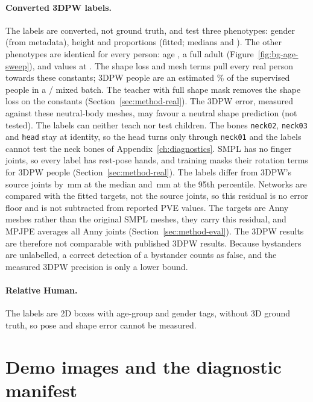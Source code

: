 \paragraph{Converted 3DPW labels.} The labels are converted, not ground truth, and test three phenotypes:
gender (from metadata), height and proportions (fitted; medians \DataLabelMedianHeight{} and
\DataLabelMedianProportions). The other \DataConstantCount{} phenotypes are identical for every person: age \DataFixedAge{}, a
full adult (Figure~\ref{fig:bg-age-sweep}), and \DataNeutralCount{} values at \DataFixedNeutral. The shape loss and
mesh terms pull every real person towards these constants; 3DPW people are an estimated
\DataSupervisedShareThreeDPW\% of the supervised people in a \DataMixAnnyOne/\DataMixThreeDPW{} mixed batch. The teacher
with full shape mask removes the shape loss on the constants (Section~\ref{sec:method-real}). The 3DPW error, measured
against these neutral-body meshes, may favour a neutral shape prediction (not tested). The labels can neither
teach nor test children. The bones \texttt{neck02}, \texttt{neck03} and
\texttt{head} stay at identity, so the head turns only through \texttt{neck01} and the labels cannot test the neck
bones of Appendix~\ref{ch:diagnostics}. SMPL has no finger joints, so every label has rest-pose hands, and training
masks their rotation terms for 3DPW people (Section~\ref{sec:method-real}). The labels differ from 3DPW's source
joints by \DataCheckJointsNew\,mm at the median and \DataCheckJointsNewPn\,mm at the 95th percentile. Networks are
compared with the fitted targets, not the source joints, so this residual is no error floor and is not
subtracted from reported PVE values. The targets are Anny meshes rather than the original SMPL meshes, they
carry this residual, and MPJPE averages all \DataBones{} Anny joints (Section~\ref{sec:method-eval}). The 3DPW
results are therefore not comparable with published 3DPW results. Because
bystanders are unlabelled, a correct detection of a bystander counts as false, and the measured 3DPW precision is
only a lower bound.

\paragraph{Relative Human.} The labels are 2D boxes with age-group and gender tags, without 3D ground
truth, so pose and shape error cannot be measured.

\section{Demo images and the diagnostic manifest}
\label{sec:data-manifest}

